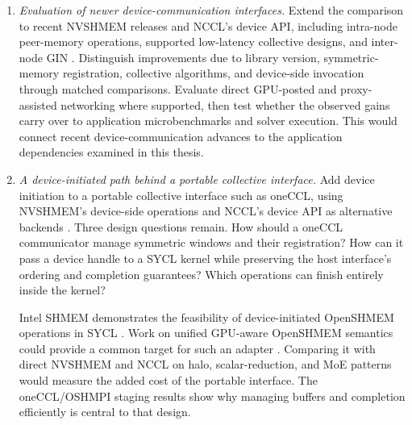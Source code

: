 \begin{enumerate}
    \item \emph{Evaluation of newer device-communication interfaces.}
    Extend the comparison to recent NVSHMEM releases and NCCL's device API, including intra-node peer-memory operations, supported low-latency collective designs, and inter-node GIN \cite{hamidouche_kernel-initiated_2026,shen_every_2026}. Distinguish improvements due to library version, symmetric-memory registration, collective algorithms, and device-side invocation through matched comparisons. Evaluate direct GPU-posted and proxy-assisted networking where supported, then test whether the observed gains carry over to application microbenchmarks and solver execution. This would connect recent device-communication advances to the application dependencies examined in this thesis.

    \item \emph{A device-initiated path behind a portable collective interface.}
    Add device initiation to a portable collective interface such as oneCCL, using NVSHMEM's device-side operations and NCCL's device API as alternative backends \cite{uxl_oneccl_2026,nvidia_nccl_device_2026}. Three design questions remain. How should a oneCCL communicator manage symmetric windows and their registration? How can it pass a device handle to a SYCL kernel while preserving the host interface's ordering and completion guarantees? Which operations can finish entirely inside the kernel?

    Intel SHMEM demonstrates the feasibility of device-initiated OpenSHMEM operations in SYCL \cite{brooks_intel_shmem_2024}. Work on unified GPU-aware OpenSHMEM semantics could provide a common target for such an adapter \cite{ravi_unified_2026}. Comparing it with direct NVSHMEM and NCCL on halo, scalar-reduction, and MoE patterns would measure the added cost of the portable interface. The oneCCL/OSHMPI staging results show why managing buffers and completion efficiently is central to that design.
\end{enumerate}

